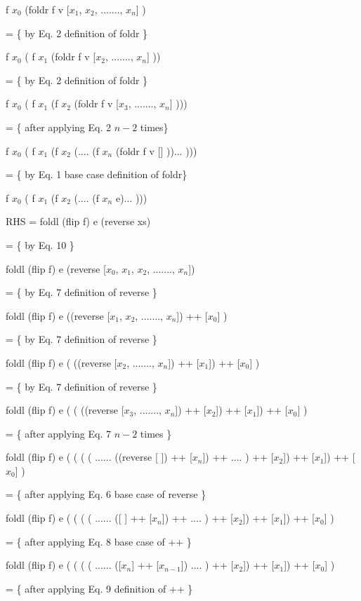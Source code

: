 \documentclass[twocolumn]{revtex4}
\begin{document}
	f $x_{0}$ (foldr f v [$x_{1}$, $x_{2}$, ......., $x_{n}$] ) 
	
	= \{ by Eq. 2 definition of foldr \}
	
	f $x_{0}$ ( f $x_{1}$ (foldr f v [$x_{2}$,  ......., $x_{n}$] )) 

	= \{ by Eq. 2 definition of foldr \}
	
	f $x_{0}$ ( f $x_{1}$ (f $x_{2}$ (foldr f v [$x_{3}$,  ......., $x_{n}$] ))) 
	
	= \{ after applying Eq. 2 $n - 2$ times\}
	
	f $x_{0}$ ( f $x_{1}$ (f $x_{2}$ (.... (f $x_{n}$ (foldr f v [] ))... ))) 

	= \{ by Eq. 1 base case definition of foldr\}
	
	f $x_{0}$ ( f $x_{1}$ (f $x_{2}$ (.... (f $x_{n}$ e)... ))) 
	
	
	

RHS = foldl (flip f) e (reverse xs)

	 = \{ by Eq. 10 \}
	 
	 foldl (flip f) e (reverse [$x_{0}$, $x_{1}$, $x_{2}$, ......., $x_{n}$])	

	 = \{ by Eq. 7 definition of reverse \}
	 
	 foldl (flip f) e ((reverse [$x_{1}$, $x_{2}$, ......., $x_{n}$]) ++ [$x_{0}$] )
	 
	 = \{ by Eq. 7 definition of reverse \}
	 
	 foldl (flip f) e ( ((reverse [$x_{2}$, ......., $x_{n}$]) ++ [$x_{1}$]) ++ [$x_{0}$] )
	 
	 = \{ by Eq. 7 definition of reverse \}
	 
	 foldl (flip f) e ( ( ((reverse [$x_{3}$, ......., $x_{n}$]) ++ [$x_{2}$]) ++ [$x_{1}$]) ++ [$x_{0}$] )
	
	 = \{ after applying Eq. 7 $n - 2$ times \}
	 
	 foldl (flip f) e ( ( ( ( ...... ((reverse [ ]) ++ [$x_{n}$]) ++  .... ) ++ [$x_{2}$]) ++ [$x_{1}$]) ++ [$x_{0}$] )

	 = \{ after applying Eq. 6 base case of reverse \}
	 
	 foldl (flip f) e ( ( ( ( ...... ([ ] ++ [$x_{n}$]) ++  .... ) ++ [$x_{2}$]) ++ [$x_{1}$]) ++ [$x_{0}$] )

	 = \{ after applying Eq. 8 base case of ++ \}
	 
	 foldl (flip f) e ( ( ( ( ...... ([$x_{n}$] ++ [$x_{n-1}$]) .... ) ++ [$x_{2}$]) ++ [$x_{1}$]) ++ [$x_{0}$] )

	 = \{ after applying Eq. 9 definition of ++ \}
	 
\end{document}
